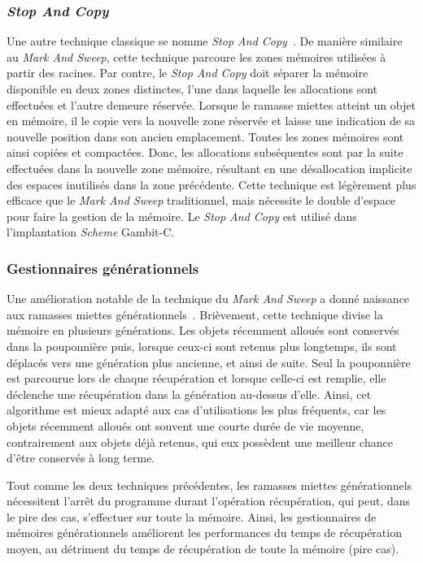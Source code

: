 \documentclass[12pt,twoside,letterpaper,francais]{book}
\newcommand{\Schemelang}{{\textit{Scheme }}}
\begin{document}
\subsubsection{\textit{Stop And Copy}}
Une autre technique classique se nomme \textit{Stop And
  Copy}~\cite{STOP_AND_COPY}. De manière similaire au \textit{Mark And
  Sweep}, cette technique parcoure les zones mémoires utilisées à
partir des racines. Par contre, le \textit{Stop And Copy} doit séparer
la mémoire disponible en deux zones distinctes, l'une dans laquelle
les allocations sont effectuées et l'autre demeure réservée. Lorsque
le ramasse miettes atteint un objet en mémoire, il le copie vers la
nouvelle zone réservée et laisse une indication de sa nouvelle
position dans son ancien emplacement. Toutes les zones mémoires sont
ainsi copiées et compactées. Donc, les allocations subséquentes sont
par la suite effectuées dans la nouvelle zone mémoire, résultant en
une désallocation implicite des espaces inutilisés dans la zone
précédente. Cette technique est légèrement plus efficace que le
\textit{Mark And Sweep} traditionnel, mais nécessite le double
d'espace pour faire la gestion de la mémoire. Le \textit{Stop And
  Copy} est utilisé dans l'implantation \Schemelang Gambit-C.


\FloatBarrier
\subsubsection{Gestionnaires générationnels}
Une amélioration notable de la technique du \textit{Mark And Sweep} a
donné naissance aux ramasses miettes
générationnels~\cite{GEN_GC}. Brièvement, cette technique divise la
mémoire en plusieurs générations. Les objets récemment alloués sont
conservés dans la pouponnière puis, lorsque ceux-ci sont retenus plus
longtemps, ils sont déplacés vers une génération plus ancienne, et
ainsi de suite. Seul la pouponnière est parcourue lors de chaque
récupération et lorsque celle-ci est remplie, elle déclenche une
récupération dans la génération au-dessus d'elle. Ainsi, cet
algorithme est mieux adapté aux cas d'utilisations les plus fréquents,
car les objets récemment alloués ont souvent une courte durée de vie
moyenne, contrairement aux objets déjà retenus, qui eux possèdent une
meilleur chance d'être conservés à long terme.

Tout comme les deux techniques précédentes, les ramasses miettes
générationnels nécessitent l'arrêt du programme durant l'opération
récupération, qui peut, dans le pire des cas, s'effectuer sur toute la
mémoire. Ainsi, les gestionnaires de mémoires générationnels
améliorent les performances du temps de récupération moyen, au
détriment du temps de récupération de toute la mémoire (pire cas).
\end{document}
